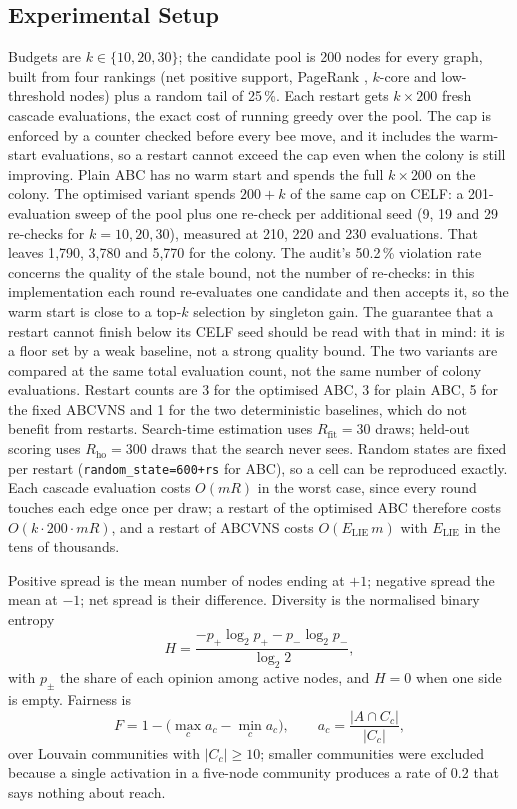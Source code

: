 \documentclass[journal,letterpaper,10pt]{IEEEtran}
\begin{document}
\subsection{Experimental Setup}

Budgets are $k\in\{10,20,30\}$; the candidate pool is 200 nodes for every graph, built from four rankings (net positive support, PageRank \cite{page1999}, $k$-core and low-threshold nodes) plus a random tail of 25\,\%. Each restart gets $k\times200$ fresh cascade evaluations, the exact cost of running greedy over the pool. The cap is enforced by a counter checked before every bee move, and it includes the warm-start evaluations, so a restart cannot exceed the cap even when the colony is still improving. Plain ABC has no warm start and spends the full $k\times200$ on the colony. The optimised variant spends $200+k$ of the same cap on CELF: a 201-evaluation sweep of the pool plus one re-check per additional seed (9, 19 and 29 re-checks for $k=10,20,30$), measured at 210, 220 and 230 evaluations. That leaves 1{,}790, 3{,}780 and 5{,}770 for the colony. The audit's 50.2\,\% violation rate concerns the quality of the stale bound, not the number of re-checks: in this implementation each round re-evaluates one candidate and then accepts it, so the warm start is close to a top-$k$ selection by singleton gain. The guarantee that a restart cannot finish below its CELF seed should be read with that in mind: it is a floor set by a weak baseline, not a strong quality bound. The two variants are compared at the same total evaluation count, not the same number of colony evaluations. Restart counts are 3 for the optimised ABC, 3 for plain ABC, 5 for the fixed ABCVNS and 1 for the two deterministic baselines, which do not benefit from restarts. Search-time estimation uses $R_{\mathrm{fit}}=30$ draws; held-out scoring uses $R_{\mathrm{ho}}=300$ draws that the search never sees. Random states are fixed per restart (\texttt{random\_state=600+rs} for ABC), so a cell can be reproduced exactly. Each cascade evaluation costs $O(mR)$ in the worst case, since every round touches each edge once per draw; a restart of the optimised ABC therefore costs $O(k\cdot200\cdot mR)$, and a restart of ABCVNS costs $O(E_{\mathrm{LIE}}\,m)$ with $E_{\mathrm{LIE}}$ in the tens of thousands.

Positive spread is the mean number of nodes ending at $+1$; negative spread the mean at $-1$; net spread is their difference. Diversity is the normalised binary entropy
\begin{equation}
H=\frac{-p_+\log_2 p_+ - p_-\log_2 p_-}{\log_2 2},
\label{eq:div}
\end{equation}
with $p_\pm$ the share of each opinion among active nodes, and $H=0$ when one side is empty. Fairness is
\begin{equation}
F=1-\bigl(\max_{c}a_c-\min_{c}a_c\bigr),\qquad a_c=\frac{|A\cap C_c|}{|C_c|},
\label{eq:fair}
\end{equation}
over Louvain communities \cite{blondel2008} with $|C_c|\ge10$; smaller communities were excluded because a single activation in a five-node community produces a rate of 0.2 that says nothing about reach.
\end{document}

